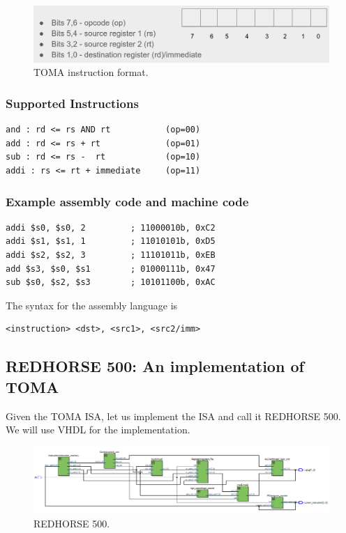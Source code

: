 \documentclass[a4paper, 11pt,oneside]{article}
\begin{document}
\begin{figure}[H]
	\begin{center}
	\includegraphics[width=5in]{ins_format.png}
	\caption{TOMA instruction format.}
	\label{fig:ins_format} 
	\end{center}
\end{figure}

\subsubsection{Supported Instructions}
\begin{verbatim}
and : rd <= rs AND rt           (op=00)
add : rd <= rs + rt             (op=01)
sub : rd <= rs -  rt            (op=10)
addi : rs <= rt + immediate     (op=11)
\end{verbatim}


\subsubsection{Example assembly code and machine code}
\begin{verbatim}
addi $s0, $s0, 2         ; 11000010b, 0xC2
addi $s1, $s1, 1         ; 11010101b, 0xD5
addi $s2, $s2, 3         ; 11101011b, 0xEB
add $s3, $s0, $s1        ; 01000111b, 0x47
sub $s0, $s2, $s3        ; 10101100b, 0xAC
\end{verbatim}

The syntax for the assembly language is
\begin{verbatim}
<instruction> <dst>, <src1>, <src2/imm>
\end{verbatim}

\subsection{REDHORSE 500: An implementation of TOMA}
Given the TOMA ISA, let us implement the ISA and call it REDHORSE 500. We will 
use VHDL for the implementation.

\begin{landscape}
\thispagestyle{plain}
\begin{figure}[H]
	\begin{center}
	\includegraphics[width=10.5in]{redhorse500.png}
	\caption{REDHORSE 500.}
	\label{fig:clock0} 
	\end{center}
\end{figure}
\end{landscape}
\end{document}
